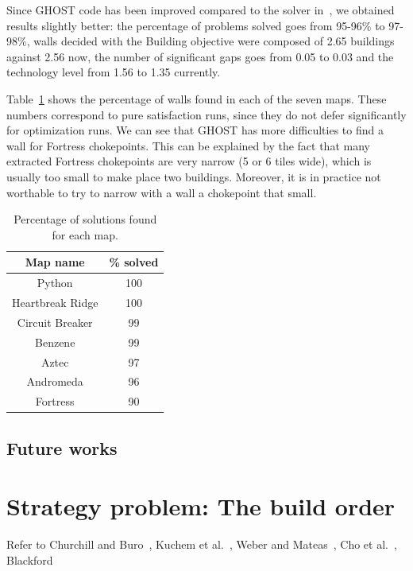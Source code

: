 \documentclass[journal]{IEEEtran}
\newcommand{\ghost}{\textsc{GHOST}\xspace}
\begin{document}
Since  \ghost   code  has  been   improved  compared  to   the  solver
in~\cite{RichouxUO14},  we  obtained   results  slightly  better:  the
percentage  of problems  solved goes  from 95-96\%  to 97-98\%,  walls
decided with  the Building objective  were composed of  2.65 buildings
against 2.56  now, the number  of significant  gaps goes from  0.05 to
0.03 and the technology level from 1.56 to 1.35 currently.

Table~\ref{tab:map} shows the percentage of walls found in each of the
seven maps. These numbers correspond  to pure satisfaction runs, since
they do not defer significantly for optimization runs. We can see that
\ghost   has  more   difficulties  to   find  a   wall  for   Fortress
chokepoints. This  can be  explained by the  fact that  many extracted
Fortress chokepoints  are very narrow  (5 or  6 tiles wide),  which is
usually too  small to make  place two  buildings.  Moreover, it  is in
practice not worthable to try to  narrow with a wall a chokepoint that
small.
\begin{table}[ht]
  \caption{Percentage of solutions found for each map.} 
    \label{tab:map}
    \centering
    \begin{tabular}{|c|c|}
      \hline
      Map name & \% solved\\
      \hline
      Python & 100\\
      Heartbreak Ridge & 100\\
      Circuit Breaker & 99\\
      Benzene & 99\\
      Aztec & 97\\
      Andromeda & 96\\
      Fortress & 90\\
      \hline
    \end{tabular}  
\end{table}



\subsection{Future works}


\section{Strategy problem: The build order}\label{sec:bo}

Refer   to   Churchill   and   Buro~\cite{ChurchillB11},   Kuchem   et
al.~\cite{KuchemPR13},  Weber   and  Mateas~\cite{WeberM09},   Cho  et
al.~\cite{ChoKC13}, Blackford~\cite{Blackford14}
\end{document}
